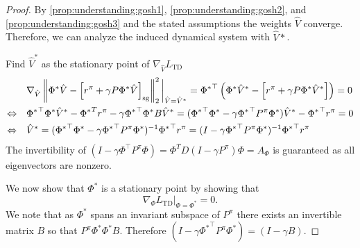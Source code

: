 \begin{proof}
    By \autoref{prop:understanding:gosh1}, \autoref{prop:understanding:gosh2}, and \autoref{prop:understanding:gosh3} and the stated assumptions the weights $\hat{V}$ converge. Therefore, we can analyze the induced dynamical system with $\hat{V}*$.

    Find $\hat{V}^*$ as the stationary point of $\nabla_{\hat{V}} L_\text{TD}$
    \begin{align}
        & \nabla_{\hat{V}} \left\lVert \Phi^* \hat{V} - \left[r^\pi + \gamma P\Phi^* \hat{V}\right]_\text{sg} \right\rVert_2^2\bigg|_{\hat{V} = \hat{V}^*} = {\Phi^*}^\top\left(\Phi^* \hat{V}^* - \left[r^\pi + \gamma P\Phi^* \hat{V}^*\right]\right) = 0 \\
        \Leftrightarrow \quad & {\Phi^*}^\top \Phi^* \hat{V}^* - {\Phi^*}^T r^\pi - \gamma {\Phi^*}^\top  \Phi^* B \hat{V}^* = ({\Phi^*}^\top \Phi^* - \gamma {\Phi^*}^\top P^\pi \Phi^*) \hat{V}^* - {\Phi^*}^\top r^\pi = 0\\
        \Leftrightarrow \quad & \hat{V}^* = ({\Phi^*}^\top \Phi^* - \gamma {\Phi^*}^\top P^\pi \Phi^*)^{-1} {\Phi^*}^\top r^\pi = (I - \gamma {\Phi^*}^\top P^\pi \Phi^*)^{-1} {\Phi^*}^\top r^\pi
    \end{align}
    The invertibility of $(I - \gamma \Phi^\top P^\pi \Phi) = \Phi^T D (I - \gamma P^\pi) \Phi = A_\Phi$ is guaranteed as all eigenvectors are nonzero.

    We now show that $\Phi^*$ is a stationary point by showing that $$\nabla_\Phi L_\text{TD}|_{\Phi = \Phi^*} = 0.$$ We note that as $\Phi^*$ spans an invariant subspace of $P^\pi$ there exists an invertible matrix $B$ so that $P^\pi \Phi^*  \Phi^* B$. Therefore $(I - \gamma {\Phi^*}^\top P^\pi \Phi^*) = (I - \gamma B)$.


\end{proof}
